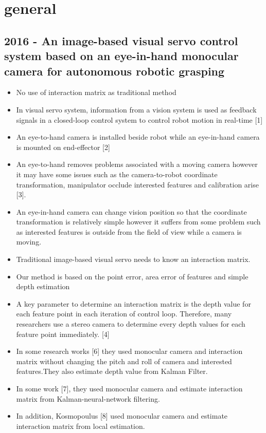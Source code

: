 \section{general}
\subsection{2016 - An image-based visual servo control system based on an eye-in-hand monocular camera for autonomous robotic grasping}
\begin{itemize}
\item No use of interaction matrix as traditional method
\item In visual servo system, information from a vision system is used as feedback signals in a closed-loop control system to control robot motion in real-time [1]
\item An eye-to-hand camera is installed beside robot while an eye-in-hand camera is mounted on end-effector [2]
\item An eye-to-hand removes problems associated with a moving camera however it may have some issues such as the camera-to-robot coordinate transformation, manipulator occlude interested features and calibration arise [3]. 
\item An eye-in-hand camera can change vision position so that the coordinate transformation is relatively simple however it suffers from some problem such as interested features is outside from the field of view while a camera is moving.
\item Traditional image-based visual servo needs to know an interaction matrix. 
\item  Our method is based on the point error, area error of features and simple depth estimation
\item A key parameter to determine an interaction matrix is the depth value for each feature point in each iteration of control loop. Therefore, many researchers use a stereo camera to determine every depth values for each feature point immediately. [4] 
\item In some research works [6] they used monocular camera and interaction matrix without changing the pitch and roll of camera and interested features.They also estimate depth value from Kalman Filter.
\item In some work [7], they used monocular camera and estimate interaction matrix from
Kalman-neural-network filtering. 
\item In addition, Kosmopoulus [8] used monocular camera and estimate interaction matrix from local estimation.
\end{itemize}
